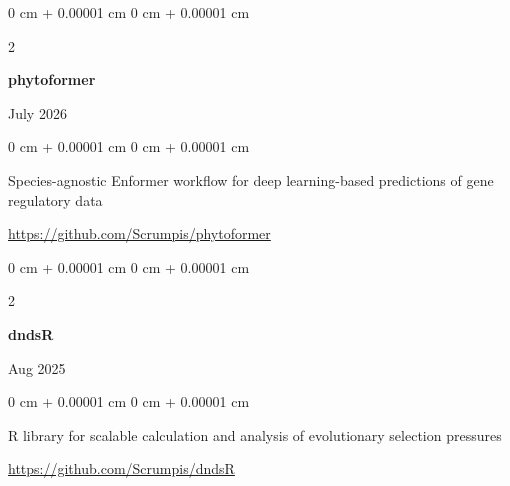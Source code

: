 \documentclass[10pt, letterpaper]{article}
\newenvironment{onecolentry}{
    \begin{adjustwidth}{
        0 cm + 0.00001 cm
    }{
        0 cm + 0.00001 cm
    }
}{
    \end{adjustwidth}
} %
\newenvironment{twocolentry}[2][]{
    \onecolentry
    \def\secondColumn{#2}
    \setcolumnwidth{\fill, 4.5 cm}
    \begin{paracol}{2}
}{
    \switchcolumn \raggedleft \secondColumn
    \end{paracol}
    \endonecolentry
} %
\begin{document}
        \begin{samepage}
            \begin{twocolentry}{
                July 2026
                }
                \textbf{phytoformer}
            \end{twocolentry}

            \vspace{0.10 cm}
            
            \begin{onecolentry}
                Species-agnostic Enformer workflow for deep learning-based predictions of gene regulatory data

                \vspace{0.10 cm}
                
                \href{https://github.com/Scrumpis/phytoformer}{https://github.com/Scrumpis/phytoformer}
            \end{onecolentry}
        \end{samepage}     


        \vspace{0.2 cm}

        
        \begin{samepage}
            \begin{twocolentry}{
                Aug 2025
                }
                \textbf{dndsR}
            \end{twocolentry}

            \vspace{0.10 cm}
            
            \begin{onecolentry}
                R library for scalable calculation and analysis of evolutionary selection pressures

                \vspace{0.10 cm}
                
                \href{https://github.com/Scrumpis/dndsR}{https://github.com/Scrumpis/dndsR}
            \end{onecolentry}
        \end{samepage}     


        \vspace{0.2 cm}
        
\end{document}
